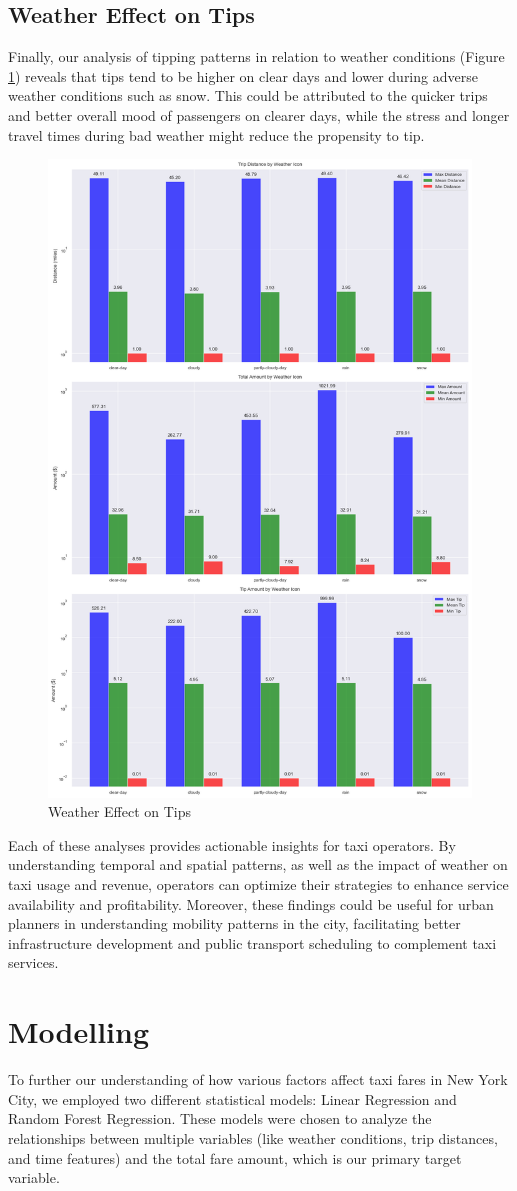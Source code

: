 \documentclass[11pt]{article}
\begin{document}
\subsection{Weather Effect on Tips}
Finally, our analysis of tipping patterns in relation to weather conditions (Figure \ref{fig:6}) reveals that tips tend to be higher on clear days and lower during adverse weather conditions such as snow. This could be attributed to the quicker trips and better overall mood of passengers on clearer days, while the stress and longer travel times during bad weather might reduce the propensity to tip.

\begin{figure}[h]
    \includegraphics[width=.45\textwidth]{image/Weather Impact tip.png}
    \centering
    \caption{Weather Effect on Tips} %
    \label{fig:6}
    
\end{figure}

Each of these analyses provides actionable insights for taxi operators. By understanding temporal and spatial patterns, as well as the impact of weather on taxi usage and revenue, operators can optimize their strategies to enhance service availability and profitability. Moreover, these findings could be useful for urban planners in understanding mobility patterns in the city, facilitating better infrastructure development and public transport scheduling to complement taxi services.



\section{Modelling}
To further our understanding of how various factors affect taxi fares in New York City, we employed two different statistical models: Linear Regression and Random Forest Regression. These models were chosen to analyze the relationships between multiple variables (like weather conditions, trip distances, and time features) and the total fare amount, which is our primary target variable.
\end{document}
